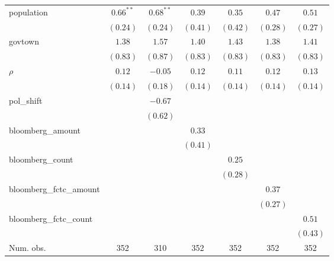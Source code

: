 \begin{table}[!h]
\begin{center}
\begin{tabular}{l c c c c c c }
population              & $0.66^{**}$  & $0.68^{**}$  & $0.39$       & $0.35$       & $0.47$       & $0.51$       \\
                        & $(0.24)$     & $(0.24)$     & $(0.41)$     & $(0.42)$     & $(0.28)$     & $(0.27)$     \\
govtown                 & $1.38$       & $1.57$       & $1.40$       & $1.43$       & $1.38$       & $1.41$       \\
                        & $(0.83)$     & $(0.87)$     & $(0.83)$     & $(0.83)$     & $(0.83)$     & $(0.83)$     \\
$\rho$                  & $0.12$       & $-0.05$      & $0.12$       & $0.11$       & $0.12$       & $0.13$       \\
                        & $(0.14)$     & $(0.18)$     & $(0.14)$     & $(0.14)$     & $(0.14)$     & $(0.14)$     \\
pol\_shift              &              & $-0.67$      &              &              &              &              \\
                        &              & $(0.62)$     &              &              &              &              \\
bloomberg\_amount       &              &              & $0.33$       &              &              &              \\
                        &              &              & $(0.41)$     &              &              &              \\
bloomberg\_count        &              &              &              & $0.25$       &              &              \\
                        &              &              &              & $(0.28)$     &              &              \\
bloomberg\_fctc\_amount &              &              &              &              & $0.37$       &              \\
                        &              &              &              &              & $(0.27)$     &              \\
bloomberg\_fctc\_count  &              &              &              &              &              & $0.51$       \\
                        &              &              &              &              &              & $(0.43)$     \\
\midrule
Num. obs.               & 352          & 310          & 352          & 352          & 352          & 352          \\

\end{tabular}
\end{center}
\end{table}
